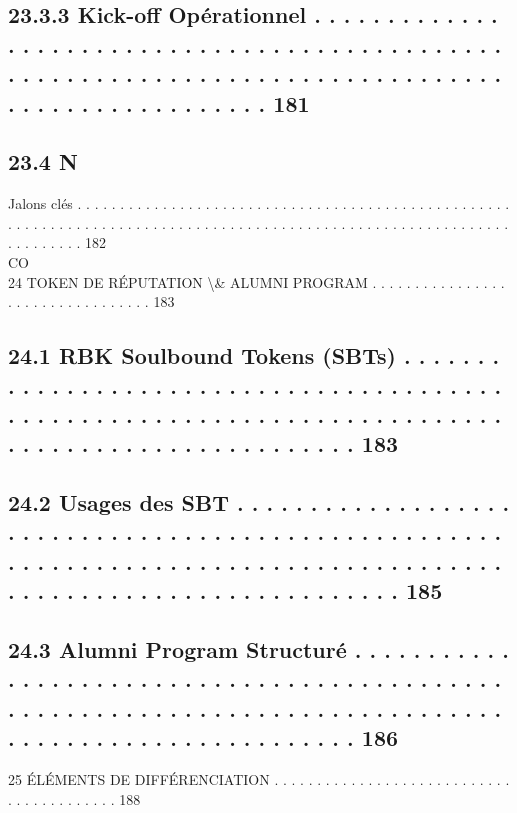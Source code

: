 \subsection{23.3.3               Kick-off Opérationnel . . . . . . . . . . . . . . . . . . . . . . . . . . . . . . . . . . . . . . . . . . . . . . . . . . . . . . . . . . . . . . . . . . . . . . . . . . . . . . . . . . . . . . . . . . . . . . . . . . . 181}
\subsection{23.4                                                                            N}
Jalons clés . . . . . . . . . . . . . . . . . . . . . . . . . . . . . . . . . . . . . . . . . . . . . . . . . . . . . . . . . . . . . . . . . . . . . . . . . . . . . . . . . . . . . . . . . . . . . . . . . . . . . . . . . . . . . . . . . . . . . . . 182\\
CO\\
24    TOKEN DE RÉPUTATION \textbackslash{}& ALUMNI PROGRAM . . . . . . . . . . . . . . . . . . . . . . . . . . . . . . . . . 183\\
\subsection{24.1    RBK Soulbound Tokens (SBTs) . . . . . . . . . . . . . . . . . . . . . . . . . . . . . . . . . . . . . . . . . . . . . . . . . . . . . . . . . . . . . . . . . . . . . . . . . . . . . . . . . . . . . . . . . . . . . . . . . . . 183}
\subsection{24.2    Usages des SBT . . . . . . . . . . . . . . . . . . . . . . . . . . . . . . . . . . . . . . . . . . . . . . . . . . . . . . . . . . . . . . . . . . . . . . . . . . . . . . . . . . . . . . . . . . . . . . . . . . . . . . . . . . . . . . . . . . 185}
\subsection{24.3    Alumni Program Structuré . . . . . . . . . . . . . . . . . . . . . . . . . . . . . . . . . . . . . . . . . . . . . . . . . . . . . . . . . . . . . . . . . . . . . . . . . . . . . . . . . . . . . . . . . . . . . . . . . . . . . . . 186}
\vspace{0.5em}
25    ÉLÉMENTS DE DIFFÉRENCIATION . . . . . . . . . . . . . . . . . . . . . . . . . . . . . . . . . . . . . . . . . 188\\
